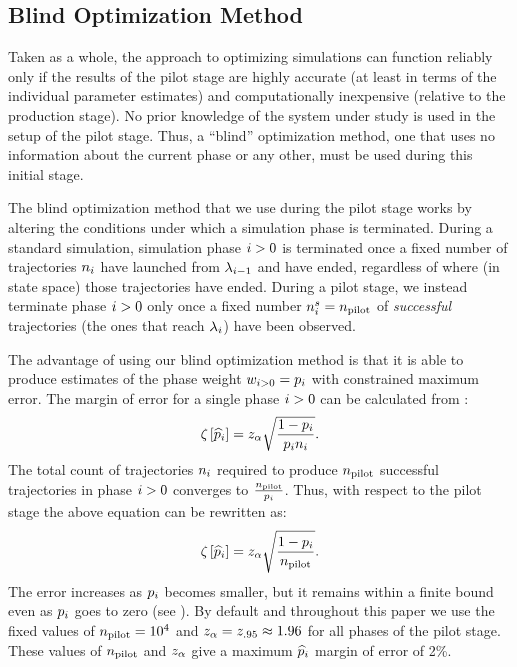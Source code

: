 %
%
%
%

\subsection{Blind Optimization Method}
\label{sec:blind_opt}
Taken as a whole, the  approach to optimizing simulations can function reliably only if the results of the pilot stage are highly accurate (at least in terms of the individual parameter estimates) and computationally inexpensive (relative to the production stage). No prior knowledge of the system under study is used in the setup of the pilot stage. Thus, a ``blind'' optimization method, one that uses no information about the current phase or any other, must be used during this initial stage.

The blind optimization method that we use during the  pilot stage works by altering the conditions under which a simulation phase is terminated. During a standard  simulation, simulation phase $i>0$ is terminated once a fixed number of trajectories $n_{i}$ have launched from ${\lambda}_{i - 1}$ and have ended, regardless of where (in state space) those trajectories have ended. During a pilot stage, we instead terminate phase $i>0$ only once a fixed number $n_{i}^{s} = n_{\textrm{pilot}}$ of \textit{successful} trajectories (\ie the ones that reach ${\lambda}_{i}$) have been observed.

The advantage of using our blind optimization method is that it is able to produce estimates of the phase weight $w_{i>0} = p_{i}$ with constrained maximum error. The margin of error for a single phase $i>0$ can be calculated from :
    \begin{equation*}
        {\zeta}_{} \left[ \widehat{p}_{i} \right] = z_{\alpha} \sqrt{\frac{1 - p_{i}}{p_{i} n_{i}}}.
    \end{equation*}
The total count of trajectories $n_{i}$ required to produce $n_{\textrm{pilot}}$ successful trajectories in phase $i>0$ converges to $\frac{n_{\textrm{pilot}}}{p_{i}}$. Thus, with respect to the pilot stage the above equation can be rewritten as:
\begin{equation}
    \label{eq:blind_opt_moe}
        {\zeta}_{} \left[ \widehat{p}_{i} \right] = z_{\alpha} \sqrt{\frac{1 - p_{i}}{n_{\textrm{pilot}}}}.
    \end{equation}
The error increases as $p_{i}$ becomes smaller, but it remains within a finite bound even as $p_{i}$ goes to zero (see ). By default and throughout this paper we use the fixed values of $n_{\textrm{pilot}} = 10^4$ and $z_{\alpha} = z_{.95} \approx 1.96$ for all phases of the pilot stage. These values of $n_{\textrm{pilot}}$ and $z_{\alpha}$ give a maximum $\widehat{p}_{i}$ margin of error of 2\%.

